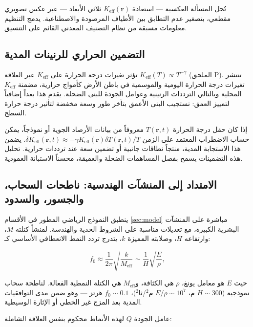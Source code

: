 \documentclass[12pt,a4paper]{article}
\newcommand{\Keff}{K_{\mathrm{eff}}}
\theoremstyle{remark}
\begin{document}
	تُحل المسألة العكسية — استعادة \(\Keff(\mathbf{r})\) ثلاثي الأبعاد — عبر عكس تصويري مقطعي، بتصغير عدم التطابق بين الأطياف المرصودة والاصطناعية. يدمج التنظيم معلومات مسبقة من نظام التصنيف المعدني القائم على التنسيق.
	
	\subsection{التضمين الحراري للرنينات المدية}
	\label{sec:thermal-modulation}
	
	تؤثر تغيرات درجة الحرارة على \(\Keff\) عبر العلاقة \(\Keff(T) \propto T^{-\gamma}\) (الملحق P). تنتشر تغيرات درجة الحرارة اليومية والموسمية في باطن الأرض كأمواج حرارية، مضمنة \(\Keff\) المحلية وبالتالي الترددات الرنينية وعوامل الجودة للبنى الضحلة. يقدم هذا بعداً إضافياً لتمييز العمق: تستجيب البنى الأعمق بتأخر طور وسعة مخفضة لتأثير درجة حرارة السطح.
	
	إذا كان حقل درجة الحرارة \(T(\mathbf{r},t)\) معروفاً من بيانات الأرصاد الجوية أو نموذجاً، يمكن حساب الاضطراب المعتمد على الزمن \(\delta \Keff(\mathbf{r},t) \approx -\gamma \Keff(\mathbf{r}) \delta T(\mathbf{r},t)/T\). يضمن هذا الاستجابة المدية، منتجاً نطاقات جانبية أو تضمين سعة عند ترددات حرارية. تحليل هذه التضمينات يسمح بفصل المساهمات الضحلة والعميقة، محسناً الاستبانة العمودية.
	
	\subsection{الامتداد إلى المنشآت الهندسية: ناطحات السحاب، والجسور، والسدود}
	\label{sec:structures}
	
	ينطبق النموذج الرياضي المطور في الأقسام \ref{sec:model} مباشرة على المنشآت البشرية الكبيرة، مع تعديلات مناسبة على الشروط الحدية والهندسة. لمنشأ كتلته \(M\)، وارتفاعه \(H\)، وصلابته المميزة \(k\)، يتدرج تردد النمط الانعطافي الأساسي كـ:
	
	\begin{equation}
		f_0 \approx \frac{1}{2\pi} \sqrt{\frac{k}{M_{\mathrm{eff}}}} \sim \frac{1}{H} \sqrt{\frac{E}{\rho}},
		\label{eq:structural-frequency}
	\end{equation}
	
	حيث \(E\) هو معامل يونغ، \(\rho\) هي الكثافة، و\(M_{\mathrm{eff}}\) هي الكتلة النمطية الفعالة. لناطحة سحاب نموذجية (\(H \sim 300\) م، \(E/\rho \sim 10^7\) م\(^2\)/ثا\(^2\))، \(f_0 \sim 0.1\) هرتز — وهو ضمن مدى التوافقيات المدية بعد المزج غير الخطي أو الإثارة الوسيطية.
	
	عامل الجودة \(Q\) لهذه الأنماط محكوم بنفس العلاقة الشاملة:
	
\end{document}

